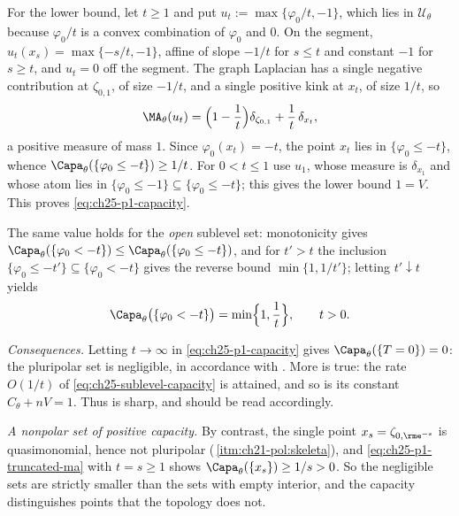\begin{example}
For the lower bound, let $t\geq1$ and put
$u_t:=\max\{\varphi_0/t,-1\}$, which lies in $\mathcal U_\theta$ because
$\varphi_0/t$ is a convex combination of $\varphi_0$ and $0$.  On the
segment, $u_t(x_s)=\max\{-s/t,-1\}$, affine of slope $-1/t$ for
$s\leq t$ and constant $-1$ for $s\geq t$, and $u_t=0$ off the
segment.  The graph Laplacian has a single negative contribution at
$\zeta_{0,1}$, of size $-1/t$, and a single positive kink at $x_t$, of
size $1/t$, so
\begin{equation}
\label{eq:ch25-p1-truncated-ma}
 \MA_\theta(u_t)=\Bigl(1-\frac1t\Bigr)\delta_{\zeta_{0,1}}
   +\frac1t\,\delta_{x_t},
\end{equation}
a positive measure of mass $1$.  Since
$\varphi_0(x_t)=-t$, the point $x_t$ lies in
$\{\varphi_0\leq-t\}$, whence
$\Capa_\theta(\{\varphi_0\leq-t\})\geq1/t$.  For $0<t\leq1$ use
$u_1$, whose measure is $\delta_{x_1}$ and whose atom lies in
$\{\varphi_0\leq-1\}\subseteq\{\varphi_0\leq-t\}$; this gives the lower
bound $1=V$.  This proves \eqref{eq:ch25-p1-capacity}.

The same value holds for the \emph{open} sublevel set: monotonicity gives
$\Capa_\theta(\{\varphi_0<-t\})\leq\Capa_\theta(\{\varphi_0\leq-t\})$, and
for $t'>t$ the inclusion
$\{\varphi_0\leq-t'\}\subseteq\{\varphi_0<-t\}$ gives the reverse bound
$\min\{1,1/t'\}$; letting $t'\downarrow t$ yields
\begin{equation}
\label{eq:ch25-p1-capacity-open}
 \Capa_\theta\bigl(\{\varphi_0<-t\}\bigr)=\min\Bigl\{1,\frac1t\Bigr\},
 \qquad t>0 .
\end{equation}

\emph{Consequences.}  Letting $t\to\infty$ in
\eqref{eq:ch25-p1-capacity} gives
$\Capa_\theta(\{T=0\})=0$: the pluripolar set is negligible, in accordance
with .  More is true: the rate
$O(1/t)$ of \eqref{eq:ch25-sublevel-capacity} is attained, and so is its
constant $C_\theta+nV=1$.  Thus  is
sharp, and  should be read accordingly.

\emph{A nonpolar set of positive capacity.}  By contrast, the single point
$x_s=\zeta_{0,\rme^{-s}}$ is quasimonomial, hence not pluripolar
(\,\cref{itm:ch21-pol:skeleta}), and
\eqref{eq:ch25-p1-truncated-ma} with $t=s\geq1$ shows
$\Capa_\theta(\{x_s\})\geq1/s>0$.  So the negligible sets are strictly
smaller than the sets with empty interior, and the capacity distinguishes
points that the topology does not.
\end{example}

